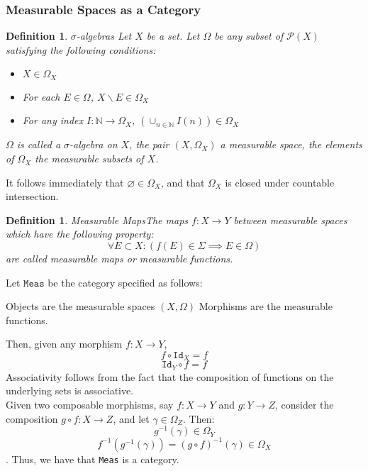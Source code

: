 \documentclass{article}
\newtheorem{definition}[subsection]{Definition}
\begin{document}
	\subsubsection{Measurable Spaces as a Category}
	\begin{definition}{$\sigma{}$-algebras}
		Let $X$ be a set.  Let $\Omega$ be any subset of $\mathcal{P}(X)$ satisfying the following conditions:
		\begin{itemize}
			\item $X\in\Omega_{X}$
			\item For each $E\in\Omega$, $X\backslash E\in\Omega_{X}$
			\item For any index $I: \mathbb{N}\rightarrow\Omega_{X}$, $(\cup_{n\in\mathbb{N}}I(n))\in\Omega_{X}$
		\end{itemize} $\Omega$ is called a $\sigma$\textit{-algebra} on $X$, the pair $(X,\Omega_{X})$ a \textit{measurable space}, the elements of $\Omega_{X}$ the \textit{measurable subsets} of $X$.  
	\end{definition}
	It follows immediately that $\varnothing\in\Omega_{X}$, and that $\Omega_{X}$ is closed under countable intersection.\\
	\begin{definition}{Measurable Maps}The maps $f: X\rightarrow Y$ between measurable spaces which have the following property: 
		\begin{equation*}
			\forall E\subset X: (f(E)\in\Sigma\implies E\in\Omega) 
		\end{equation*}
		are called \textit{measurable maps} or \textit{measurable functions}.
	\end{definition}
	Let $\texttt{Meas}$ be the category specified as follows:
	\begin{outline}
		\1 Objects are the measurable spaces $(X,\Omega)$
		\1 Morphisms are the measurable functions.
	\end{outline}
	Then, given any morphism $f: X\rightarrow{}Y$,
	\begin{equation*}
		f\circ\texttt{Id}_X = f
	\end{equation*}
	\begin{equation*}
		\texttt{Id}_Y\circ{}f = f
	\end{equation*}
	Associativity follows from the fact that the composition of functions on the underlying sets is associative.\\Given two composable morphisms, say $f: X\rightarrow{}Y$ and $g:Y\rightarrow{}Z$, consider the composition $g\circ f: X\rightarrow{}Z$, and let $\gamma\in\Omega_{Z}$.  Then:
	\begin{equation*}
		g^{-1}(\gamma) \in \Omega_{Y}
	\end{equation*}
	\begin{equation*}
		f^{-1}(g^{-1}(\gamma)) = (g\circ f)^{-1}(\gamma) \in\Omega_{X}
	\end{equation*}.
	Thus, we have that \texttt{Meas} is a category.
	
\end{document}
